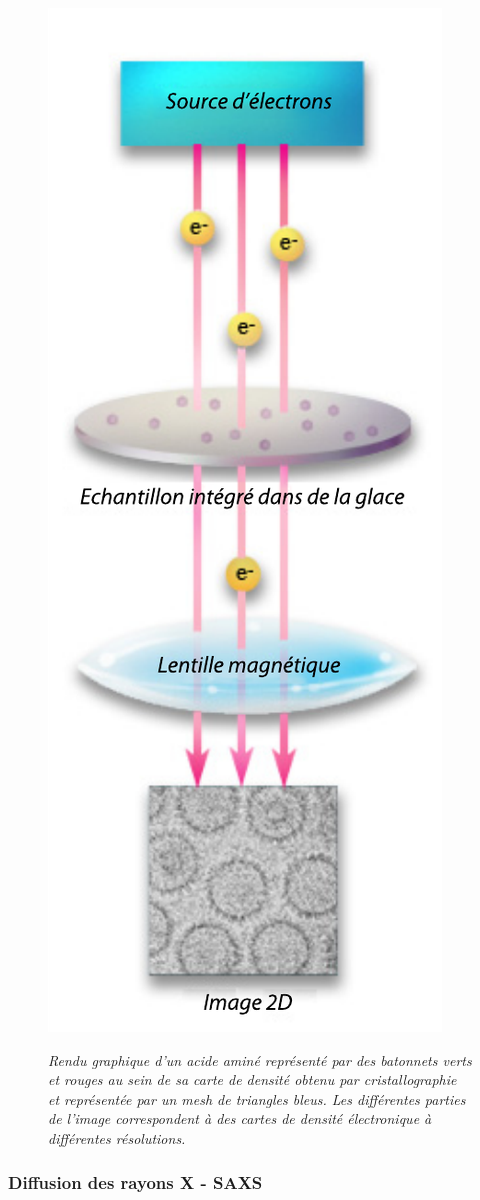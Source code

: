 \begin{figure}
  \centering
  {\includegraphics[width=0.4\linewidth]{./figures/ch1/cryoem.pdf}}
    \caption{\it Rendu graphique d'un acide aminé représenté par des batonnets verts et rouges au sein de sa carte de densité obtenu par cristallographie et représentée par un mesh de triangles bleus. Les différentes parties de l'image correspondent à des cartes de densité électronique à différentes résolutions.}
    \label{Fig:cryoem}
  \hspace{0.3cm}
\end{figure}

\subsubsection{Diffusion des rayons X - SAXS}

